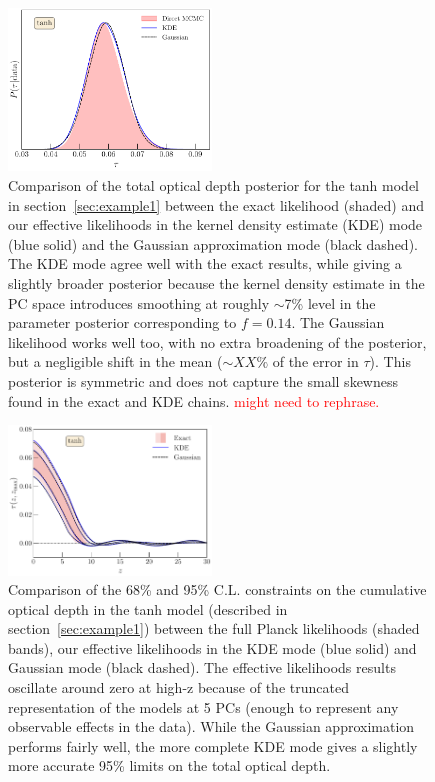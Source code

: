 \documentclass[prd,twocolumn,amsmath,amssymb,floatfix,superscriptaddress,nofootinbib]{revtex4-1}
\newcommand{\refsec}[1]{section~\ref{sec:#1}}
\newcommand{\ch}[1]{\textcolor{red}{#1}}
\begin{document}
\begin{figure}
\includegraphics[width=0.48\textwidth]
{paper/plots/pl18_tau_posterior_tanh_vs_tanh_kde_vs_tanh_gaussian_dz_auto_zre_prior_6p1_normalized_by_max.pdf}
\caption{Comparison of the total optical depth posterior for the tanh model in \refsec{example1} between the exact likelihood (shaded) and our effective likelihoods in the kernel density estimate (KDE) mode (blue solid) and the Gaussian approximation mode (black dashed). The KDE mode agree well with the exact results, while giving a slightly broader posterior because the kernel density estimate in the PC space introduces smoothing at roughly $\sim$7\% level in the parameter posterior corresponding to $f = 0.14$. The Gaussian likelihood works well too, with no extra broadening of the posterior, but a negligible shift in the mean ($\sim XX\%$ of the error in $\tau$). This posterior is symmetric and does not capture the small skewness found in the exact and KDE chains. \ch{might need to rephrase.} 
}
\label{fig:tanh}

\end{figure}


\begin{figure}[ht]
\includegraphics[width=0.48\textwidth]{paper/plots/pl18_taugtz_tanh_direct_vs_kde_vs_gaussian.pdf}
\caption{Comparison of the 68\% and 95\% C.L. constraints on the cumulative optical depth in the tanh model (described in \refsec{example1}) between the full Planck likelihoods (shaded bands), our effective likelihoods in the KDE mode (blue solid) and Gaussian mode (black dashed). The effective likelihoods results oscillate around zero at high-z because of the truncated representation of the models at 5 PCs (enough to represent any observable effects in the data). While the Gaussian approximation performs fairly well, the more complete KDE mode gives a slightly more accurate 95\% limits on the total optical depth. }
\label{fig:plot_taugtz_PC_vs_tanh}
\end{figure}
\end{document}
